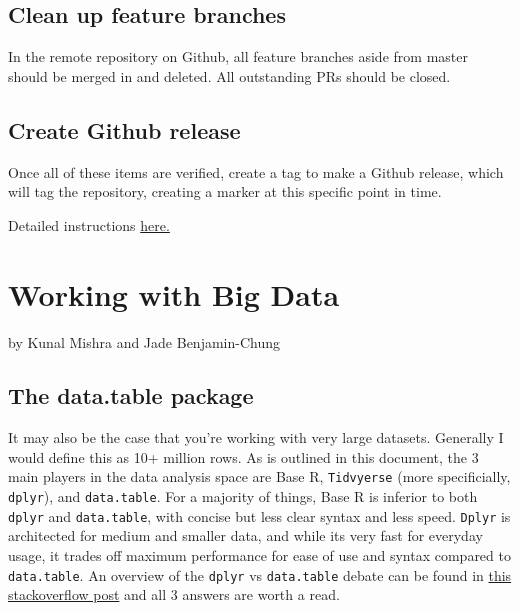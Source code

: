 \documentclass[]{book}
\begin{document}
\hypertarget{clean-up-feature-branches}{\section{Clean up feature
branches}\label{clean-up-feature-branches}}

In the remote repository on Github, all feature branches aside from
master should be merged in and deleted. All outstanding PRs should be
closed.

\hypertarget{create-github-release}{\section{Create Github
release}\label{create-github-release}}

Once all of these items are verified, create a tag to make a Github
release, which will tag the repository, creating a marker at this
specific point in time.

Detailed instructions
\href{https://docs.github.com/en/enterprise/2.13/user/articles/creating-releases}{here.}

\chapter{Working with Big Data}\label{working-with-big-data}

by Kunal Mishra and Jade Benjamin-Chung

\section{The data.table package}\label{the-data.table-package}

It may also be the case that you're working with very large datasets.
Generally I would define this as 10+ million rows. As is outlined in
this document, the 3 main players in the data analysis space are Base R,
\texttt{Tidvyerse} (more specificially, \texttt{dplyr}), and
\texttt{data.table}. For a majority of things, Base R is inferior to
both \texttt{dplyr} and \texttt{data.table}, with concise but less clear
syntax and less speed. \texttt{Dplyr} is architected for medium and
smaller data, and while its very fast for everyday usage, it trades off
maximum performance for ease of use and syntax compared to
\texttt{data.table}. An overview of the \texttt{dplyr} vs
\texttt{data.table} debate can be found in
\href{https://stackoverflow.com/questions/21435339/data-table-vs-dplyr-can-one-do-something-well-the-other-cant-or-does-poorly/27840349\#27840349}{this
stackoverflow post} and all 3 answers are worth a read.
\end{document}
